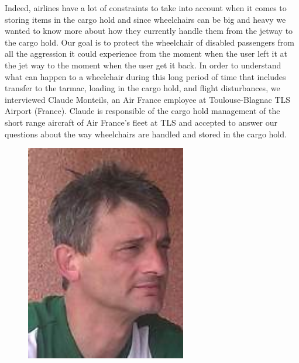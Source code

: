 Indeed, airlines have a lot of constraints to take into account when it comes to storing items in the cargo hold and since wheelchairs can be big and heavy we wanted to know more about how they currently handle them from the jetway to the cargo hold. Our goal is to protect the wheelchair of disabled passengers from all the aggression it could experience from the moment when the user left it at the jet way to the moment when the user get it back. In order to understand what can happen to a wheelchair during this long period of time that includes transfer to the tarmac, loading in the cargo hold, and flight disturbances, we interviewed Claude Monteils, an Air France employee at Toulouse-Blagnac TLS Airport (France). Claude is responsible of the cargo hold management of the short range aircraft of Air France’s fleet at TLS and accepted to answer our questions about the way wheelchairs are handled and stored in the cargo hold.
\begin{figure}[h]
\centering
\includegraphics[width=7cm]{images/claude_monteils}
\label{fig:claude_monteils}
\end{figure}

